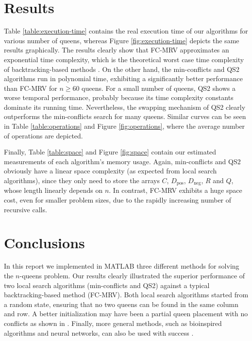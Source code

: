 \section{Results}

Table \ref{table:execution-time} contains the real execution time of our algorithms for various number of queens, whereas Figure \ref{fig:execution-time} depicts the same results graphically. The results clearly show that FC-MRV approximates an exponential time complexity, which is the theoretical worst case time complexity of backtracking-based methods \citep{aima}. On the other hand, the min-conflicts and QS2 algorithms run in polynomial time, exhibiting a significantly better performance than FC-MRV for $n \ge 60$ queens. For a small number of queens, QS2 shows a worse temporal performance, probably because its time complexity constants dominate its running time. Nevertheless, the swapping mechanism of QS2 clearly outperforms the min-conflicts search for many queens.  Similar curves can be seen in Table \ref{table:operations} and Figure \ref{fig:operations}, where the average number of operations are depicted.

Finally, Table \ref{table:space} and Figure \ref{fig:space} contain our estimated measurements of each algorithm's memory usage. Again, min-conflicts and QS2 obviously have a linear space complexity (as expected from local search algorithms), since they only need to store the arrays $C$, $D_{\text{pos}}$, $D_{\text{neg}}$, $R$ and $Q$, whose length linearly depends  on $n$. In contrast, FC-MRV exhibits a huge space cost, even for smaller problem sizes, due to the rapidly increasing number of recursive calls.













\section{Conclusions}

In this report we implemented in MATLAB three different methods for solving the $n$-queens problem. Our results clearly illustrated the superior performance of two local search algorithms (min-conflicts and QS2) against a typical backtracking-based method (FC-MRV). Both local search algorithms started from a random state, ensuring that no two queens can be found in the same column and row. A better initialization may have been a partial queen placement with no conflicts as shown in \citet{sosic91}. Finally, more general methods, such as bioinspired algorithms and neural networks, can also be used with success \citep{review}.











